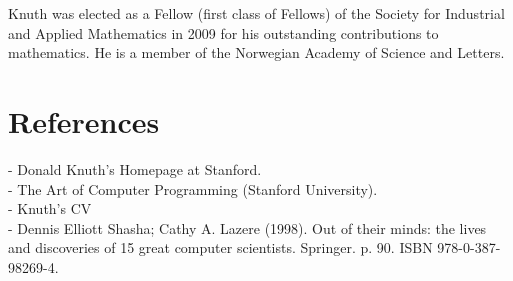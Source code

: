 \documentclass[10pt,letterpaper]{book}
\begin{document}
Knuth was elected as a Fellow (first class of Fellows) of the Society 
for Industrial and Applied Mathematics in 2009 for his outstanding 
contributions to mathematics. He is a member of the Norwegian 
Academy of Science and Letters.

\appendix
\chapter{References}
- Donald Knuth's Homepage at Stanford.\\
-  The Art of Computer Programming (Stanford University).\\
- Knuth's CV\\
- Dennis Elliott Shasha; Cathy A. Lazere (1998). Out of their minds: the lives and discoveries of 15 great computer scientists. Springer. p. 90. ISBN 978-0-387-98269-4.
\end{document}
